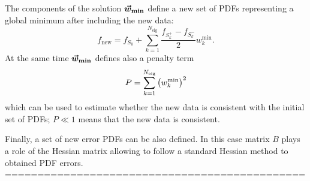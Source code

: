 The components of the solution $\boldsymbol{\vec{w}_{\text{{\bf min}}}}$ define a new set
of PDFs representing a global minimum after including the new data:
\begin{equation}
f_{\text{new}} = f_{S_0} + \sum_{k=1}^{N_{\text{eig}}} \frac{f_{S_k^+}-f_{S_k^-}}{2} w_k^{\text{min}}.
\end{equation}
At the same time $\boldsymbol{\vec{w}_{\text{{\bf min}}}}$ defines also a penalty term
\begin{equation}
P = \sum_{k=1}^{N_{\text{eig}}} \left( w_k^{\text{min}} \right)^2
\end{equation}
which can be used to estimate whether the new data is consistent with the initial set of PDFs;
$P\ll1$ means that the new data is consistent.

Finally, a set of new error PDFs can be also defined. In this case matrix $B$ plays a role of
the Hessian matrix allowing to follow a standard Hessian method to obtained PDF errors.
%
%
\\
==============================================\\



